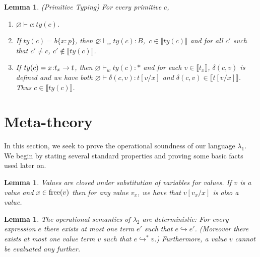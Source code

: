 \documentclass[11pt]{article}
\newtheorem{lemma}[theorem]{Lemma}
\newcommand{\bind}{\hspace{0.05em}{:}\hspace{0.05em}} %
\newcommand{\col}{\mathbin{:}}       %
\newcommand{\lb}{\llbracket}         %
\newcommand{\rb}{\rrbracket}         %
\newcommand{\step}{\hookrightarrow}
\newcommand{\many}{\hookrightarrow^*}
\newcommand{\functype}[3]{#1\bind #2 \rightarrow #3}
\begin{document}
\begin{lemma}(Primitive Typing) For every primitive $c$, 
\begin{enumerate}
\item $\varnothing \vdash c : ty(c)$. %
\item If $ty(c) = b\{x \col p\}$, then $\varnothing \vdash_w ty(c) : B$,\, $c \in \lb ty(c) \rb$ and for all $c'$ such that $c' \neq c$, $c' \not\in \lb ty(c)\rb$.
\item If $ty(c) = \functype{x}{t_x}{t}$, then $\varnothing \vdash_w ty(c) : * $ and for each $v \in \lb t_x\rb$, $\delta(c,v)$ is defined and we have both $\varnothing \vdash \delta(c,v) : t[v/x] $ and $\delta(c,v) \in \lb t[v/x] \rb$. Thus $c \in \lb ty(c) \rb$.
\end{enumerate}\label{prim-typing}
\end{lemma}

\section{Meta-theory}  %

In this section, we seek to prove the operational soundness of our language $\lambda_1$. We begin by stating several standard properties and proving some basic facts used later on.

\begin{lemma}\label{value-sub}
Values are closed under substitution of variables for values. If $v$ is a value and $x \in {\rm free}(v)$ then for any value $v_x$, we have that $v[v_x/x]$ is also a value.
\end{lemma}

\begin{lemma}\label{step-determ}
The operational semantics of $\lambda_2$ are deterministic: For every expression $e$ there exists at most one term $e'$ such that $e \step e'$. (Moreover there exists at most one value term $v$ such that $e \many v$.) Furthermore, a value $v$ cannot be evaluated any further.
\end{lemma}
\end{document}

